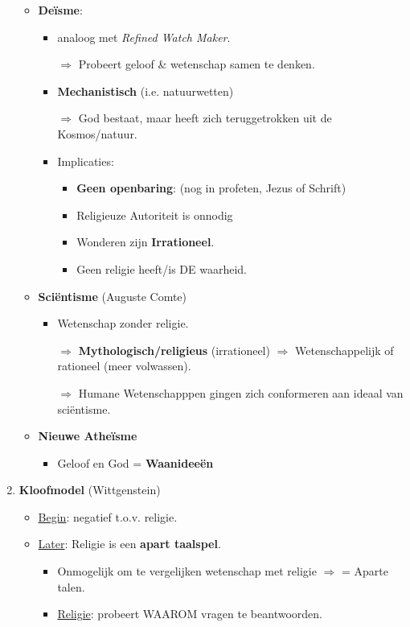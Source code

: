 \begin{enumerate}
\begin{itemize}
		\item \textbf{De\"isme}:
		\begin{itemize}
			\item analoog met \textit{Refined Watch Maker}.
			\item[$\Rightarrow$] Probeert geloof \& wetenschap samen te denken.
			\item \textbf{Mechanistisch} (i.e. natuurwetten)
			\item[$\Rightarrow$] God bestaat, maar heeft zich teruggetrokken uit de Kosmos/natuur.
			\item Implicaties:
			\begin{itemize}
				\item \textbf{Geen openbaring}: (nog in profeten, Jezus of Schrift)
				\item Religieuze Autoriteit is onnodig
				\item Wonderen zijn \textbf{Irrationeel}.
				\item Geen religie heeft/is DE waarheid.
			\end{itemize}
		\end{itemize}
		\item \textbf{Sci\"entisme} (Auguste Comte)
		\begin{itemize}
			\item Wetenschap zonder religie.
			\item[$\Rightarrow$] \textbf{Mythologisch/religieus} (irrationeel) $\Rightarrow$ Wetenschappelijk of rationeel (meer volwassen).
			\item[$\Rightarrow$] Humane Wetenschapppen gingen zich conformeren aan ideaal van sci\"entisme.
		\end{itemize}
		\item \textbf{Nieuwe Athe\"isme}
		\begin{itemize}
			\item Geloof en God = \textbf{Waanidee\"en}
		\end{itemize}
	\end{itemize}
	\item \textbf{Kloofmodel} (Wittgenstein)
	\begin{itemize}
		\item \underline{Begin}: negatief t.o.v. religie.
		\item \underline{Later}: Religie is een \textbf{apart taalspel}.
		\begin{itemize}
			\item Onmogelijk om te vergelijken wetenschap met religie $\Rightarrow$ = Aparte talen.
			\item \underline{Religie}: probeert WAAROM vragen te beantwoorden.

\end{itemize}
\end{itemize}
\end{enumerate}
